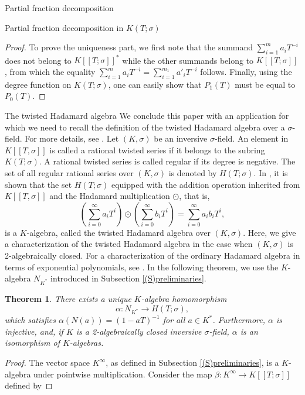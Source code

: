 \documentclass[11pt,a4paper]{article}
\theoremstyle{theorem}
\newtheorem{theorem}{Theorem}[section]
\numberwithin{equation}{section}
\newcommand{\s}{\sigma}
\begin{document}
\begin{section}{Partial fraction decomposition}
\begin{subsection}{Partial fraction decomposition in $K(T;\sigma)$}
\begin{proof}
			 To prove the uniqueness part, we first note that the summand $\sum_{i=1}^m a_iT^{-i}$ does not belong to $K[[T;\s]]^*$ while the other summands belong to  $K[[T;\s]]$, from which the equality $\sum_{i=1}^m a_iT^{-i}=\sum_{i=1}^{m_1} a'_iT^{-i}$ follows. Finally, using the degree function on $K(T;\s)$, one can easily show that  $P_1(T)$ must be equal to $P_0(T)$. 
	\end{proof}	
	
	\end{subsection}
\begin{subsection}{The twisted Hadamard algebra}
	We conclude this paper with an application for which we need to recall the definition of the twisted Hadamard algebra over a $\s$-field. For more details, see \cite{aryapoor2022rational}. Let $(K,\s)$ be an inversive $\s$-field. An element in $K[[T,\s]]$ is called a rational twisted series if it belongs to the subring $K(T;\s)$. A rational twisted series is called regular if its degree is negative. The set of all regular rational series over $(K,\s)$ is denoted by $H(T;\s)$. In \cite{aryapoor2022rational}, it is shown that the set $H(T;\s)$ equipped with the addition operation inherited from $K[[T,\s]]$ and the Hadamard multiplication $\odot$, that is, 
	$$\left( \sum_{i=0}^\infty a_i T^i\right) \odot \left(\sum_{i=0}^\infty b_i T^i\right) =
	\sum_{i=0}^\infty a_i b_i T^i,$$	
	is a $K$-algebra, called the twisted Hadamard algebra over $(K,\s)$. Here, we give a characterization of the  twisted Hadamard algebra in the case when $(K,\s)$ is 2-algebraically closed. For a characterization of the ordinary Hadamard algebra in terms of exponential polynomials, see \cite{berstel1988rational}. In the following theorem, we use the $K$-algebra $N_{K^*}$  introduced in Subsection \ref{(S)preliminaries}. 
	\begin{theorem}\label{(T)Hadamard}
		There exists a unique $K$-algebra homomorphism 
		$$\alpha:N_{K^*}\to H(T;\s),$$
		which satisfies $\alpha(N(a))=(1-aT)^{-1}$ for all $a\in K^*$. Furthermore, $\alpha$ is injective, and, if $K$ is a  2-algebraically closed inversive $\s$-field,  $\alpha$ is an isomorphism of $K$-algebras. 
	\end{theorem}
	\begin{proof}
		The vector space $K^\infty $, as defined in Subsection \ref{(S)preliminaries}, is a $K$-algebra under pointwise multiplication.  Consider the map $\beta:K^\infty\to K[[T;\s]]$ defined by 

\end{proof}
\end{subsection}
\end{section}
\end{document}
